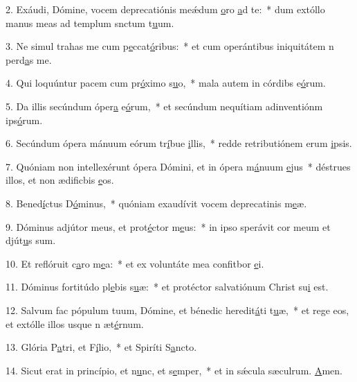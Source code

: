 2. Exáudi, Dómine, vocem deprecatiónis meǽdum \uline{o}ro \uline{a}d te:~* dum extóllo manus meas ad templum snctum t\uline{u}um.\par 
3. Ne simul trahas me cum p\uline{e}ccat\uline{ó}ribus:~* et cum operántibus iniquitátem n perd\uline{a}s me.\par 
4. Qui loquúntur pacem cum pr\uline{ó}ximo s\uline{u}o,~* mala autem in córdibs e\uline{ó}rum.\par 
5. Da illis secúndum óper\uline{a} e\uline{ó}rum,~* et secúndum nequítiam adinventiónm ips\uline{ó}rum.\par 
6. Secúndum ópera mánuum eórum tr\uline{í}bue \uline{i}llis,~* redde retributiónem erum \uline{i}psis.\par 
7. Quóniam non intellexérunt ópera Dómini, et in ópera m\uline{á}nuum \uline{e}jus~* déstrues illos, et non ædificbis \uline{e}os.\par 
8. Bened\uline{í}ctus D\uline{ó}minus,~* quóniam exaudívit vocem deprecatinis m\uline{e}æ.\par 
9. Dóminus adjútor meus, et prot\uline{é}ctor m\uline{e}us:~* in ipso sperávit cor meum et djút\uline{u}s sum.\par 
10. Et reflóruit c\uline{a}ro m\uline{e}a:~* et ex voluntáte mea confitbor \uline{e}i.\par 
11. Dóminus fortitúdo pl\uline{e}bis s\uline{u}æ:~* et protéctor salvatiónum Christ su\uline{i} est.\par 
12. Salvum fac pópulum tuum, Dómine, et bénedic heredit\uline{á}ti t\uline{u}æ,~* et rege eos, et extólle illos usque n æt\uline{é}rnum.\par 
13. Glória P\uline{a}tri, et F\uline{í}lio,~* et Spiríti S\uline{a}ncto.\par 
14. Sicut erat in princípio, et n\uline{u}nc, et s\uline{e}mper,~* et in sǽcula sæculrum. \uline{A}men.\par 
